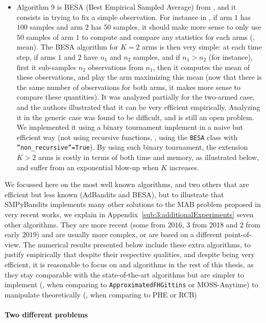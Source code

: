 \begin{itemize}
    \item Algorithm 9 is
    BESA (Best Empirical Sampled Average) from \cite{Baransi2014}, and it consists in trying to fix a simple observation.
    For instance in \UCB, if arm $1$ has $100$ samples and arm $2$ has $50$ samples, it should make more sense to only use $50$ samples of arm $1$ to compute and compare any statistics for each arms (\eg, mean).
    The BESA algorithm for $K=2$ arms is then very simple: at each time step, if arms $1$ and $2$ have $n_1$ and $n_2$ samples, and if $n_1>n_2$ (for instance), first it sub-samples $n_2$ observations from $n_1$, then it computes the mean of these observations, and play the arm maximizing this mean (now that there is the same number of observations for both arms, it makes more sense to compare these quantities).
    It was analyzed partially for the two-armed case, and the authors illustrated that it can be very efficient empirically.
    Analyzing it in the generic case was found to be difficult, and is still an open problem.
    We implemented it using a binary tournament implement in a naive but efficient way (not using recursive functions, \ie, using the \texttt{BESA} class with \texttt{''non\_recursive''=True}).
    By using such binary tournament, the extension $K>2$ arms is costly in terms of both time and memory, as illustrated below, and suffer from an exponential blow-up when $K$ increases.
\end{itemize}

We focussed here on the most well known algorithms, and two others that are efficient but less known (AdBandits and BESA),
but to illustrate that SMPyBandits implements many other solutions to the MAB problem proposed in very recent works, we explain in Appendix~\ref{sub:3:additionalExperiments} seven other algorithms.
They are more recent (some from $2016$, $3$ from $2018$ and $2$ from early $2019$) and are usually more complex, or are based on a different point-of-view.
The numerical results presented below include these extra algorithms, to justify empirically that despite their respective qualities, and despite being very efficient, it is reasonable to focus on \UCB{} and \klUCB{} algorithms in the rest of this thesis, as they stay comparable with the state-of-the-art algorithms but are simpler to implement (\eg, when comparing \UCB{} to \texttt{ApproximatedFHGittins} or $\mathrm{MOSS}$-$\mathrm{Anytime}$) to manipulate theoretically (\eg, when comparing \klUCB{} to PHE or RCB)


\paragraph{Two different problems}

